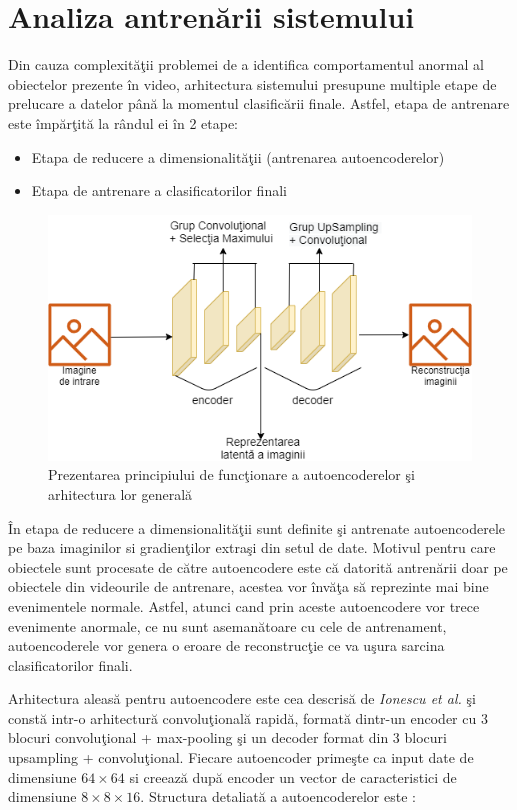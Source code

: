 \documentclass[a4paper,12pt]{report}
\begin{document}
\section{Analiza antrenării sistemului}
\quad Din cauza complexităţii problemei de a identifica comportamentul anormal al obiectelor prezente în video, arhitectura sistemului presupune multiple etape de prelucare a datelor până la momentul clasificării finale. Astfel, etapa de antrenare este împărţită la rândul ei în 2 etape:
\begin{itemize}
\item Etapa de reducere a dimensionalităţii (antrenarea autoencoderelor)
\item Etapa de antrenare a clasificatorilor finali
\end{itemize}
\begin{figure}[h]
\begin{center}
        \includegraphics[width=1\textwidth]{images/arhitectura_autoencoder}
			 \caption{Prezentarea principiului de funcţionare a autoencoderelor şi arhitectura lor generală}
			 \label{fig:arhitectura_autoencoder}
\end{center}
\end{figure}
\par În etapa de reducere a dimensionalităţii sunt definite şi antrenate autoencoderele pe baza imaginilor si gradienţilor extraşi din setul de date. Motivul pentru care obiectele sunt procesate de către autoencodere este că datorită antrenării doar pe obiectele din videourile de antrenare, acestea vor învăţa să reprezinte mai bine evenimentele normale. Astfel, atunci cand prin aceste autoencodere vor trece evenimente anormale, ce nu sunt asemanătoare cu cele de antrenament, autoencoderele vor genera o eroare de reconstrucţie ce va uşura sarcina clasificatorilor finali.
\par Arhitectura aleasă pentru autoencodere este cea descrisă de \emph{Ionescu et al.}  \cite{ionescu2019object} şi constă intr-o arhitectură convoluţională rapidă, formată dintr-un encoder cu 3 blocuri convoluţional + max-pooling şi un decoder format din 3 blocuri upsampling + convoluţional. Fiecare autoencoder primeşte ca input date de dimensiune \(64 \times 64\) si creează după encoder un vector de caracteristici de dimensiune \(8 \times 8 \times 16\).  Structura detaliată a autoencoderelor este : 
\end{document}
